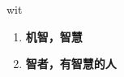 
\begin{frame}
{\huge wit}
\begin{center}
\begin{enumerate}\Large
  \item \textbf{机智，智慧}
  \item \textbf{智者，有智慧的人}
\end{enumerate}
\end{center}
\end{frame}
